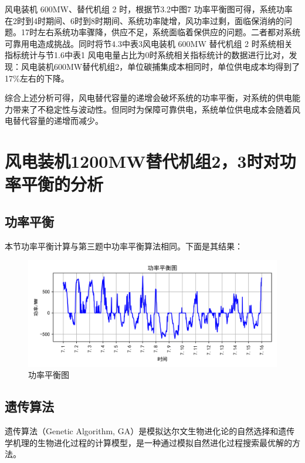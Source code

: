 \documentclass{cumcmthesis}
\begin{document}
	风电装机 600MW、替代机组 2 时，根据节3.2中图7 功率平衡图可得，系统功率在2时到4时期间、6时到8时期间、系统功率陡增，风功率过剩，面临保消纳的问题。17时左右系统功率骤降，供应不足，系统面临着保供应的问题。二者都对系统可靠用电造成挑战。同时将节4.3中表3风电装机 600MW 替代机组 2 时系统相关指标统计与节1.6中表1 风电电量占比为0时系统相关指标统计的数据进行比对，发现：风电装机600MW替代机组2，单位碳捕集成本相同时，单位供电成本均得到了17\%左右的下降。
	
	综合上述分析可得，风电替代容量的递增会破坏系统的功率平衡，对系统的供电能力带来了不稳定性与波动性。但同时为保障可靠供电，系统单位供电成本会随着风电替代容量的递增而减少。
	
	 \newpage
	\section{风电装机1200MW替代机组2，3时对功率平衡的分析}
	
	\subsection{功率平衡}\label{功率平衡}
	本节功率平衡计算与第三题中功率平衡算法相同。下面是其结果：
	
	\begin{figure}[H]
		\centering
		\includegraphics[width=1\linewidth]{figures/第七题：功率平衡图}
		\caption{功率平衡图}
		\label{fig:}
	\end{figure}
	
	
	
	\subsection{遗传算法}
	
	
	遗传算法（Genetic Algorithm, GA）是模拟达尔文生物进化论的自然选择和遗传学机理的生物进化过程的计算模型，是一种通过模拟自然进化过程搜索最优解的方法\cite{2}。
	
\end{document}
